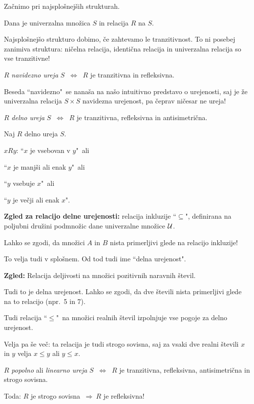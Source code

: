 \documentclass[11pt,paper=b5,footinclude,headinclude]{scrbook} %
\def\sledi {{~\Rightarrow~}}
\def\cee {{~\Leftrightarrow~}}
\begin{document}
\bigskip
Začnimo pri najsplošnejših strukturah.

\bigskip

Dana je univerzalna množica $S$ in relacija $R$ na $S$.

Najsplošnejšo strukturo dobimo, če zahtevamo le tranzitivnost.
To ni posebej zanimiva struktura: ničelna relacija, identična relacija in univerzalna relacija so vse tranzitivne!

\bigskip
$R$ {\em navidezno ureja} $S$ $\cee$ $R$ je tranzitivna in refleksivna.

Beseda ``navidezno"~se nanaša na našo intuitivno predstavo o urejenosti, saj je že univerzalna relacija $S\times S$ navidezna urejenost, pa čeprav ničesar ne ureja!

\medskip
$R$ {\em delno ureja} $S$ $\cee$ $R$ je tranzitivna, refleksivna in antisimetrična.

\medskip
Naj $R$ delno ureja $S$.

$xRy$: ``$x$ je vsebovan v $y$"~ali

``$x$ je manjši ali enak $y$"~ali

``$y$ vsebuje $x$"~ali

``$y$ je večji ali enak $x$".

\medskip
\textbf{ Zgled za relacijo delne urejenosti:} relacija inkluzije ``$\subseteq$", definirana na poljubni družini podmnožic dane univerzalne množice ${\cal U}$.

Lahko se zgodi, da množici  $A$ in $B$ nista primerljivi glede na relacijo inkluzije!

To velja tudi v splošnem. Od tod tudi ime ``delna urejenost".

\medskip
\textbf{ Zgled:} Relacija deljivosti na množici pozitivnih naravnih števil.

Tudi to je delna urejenost. Lahko se zgodi, da dve števili nista primerljivi glede na to relacijo (npr.~5 in 7).

\bigskip
Tudi relacija ``$\le$"~na množici realnih števil izpolnjuje vse pogoje za delno urejenost.

Velja pa še več: ta relacija je tudi strogo sovisna, saj za vsaki dve realni števili $x$ in $y$ velja $x\le y$ ali $y\le x$.


\bigskip

$R$ {\em popolno} ali {\em linearno ureja} $S$ $\cee$ $R$ je tranzitivna, refleksivna,
antisimetrična in strogo sovisna.

\bigskip
Toda: $R$ je strogo sovisna $\sledi R$ je refleksivna!
\end{document}
